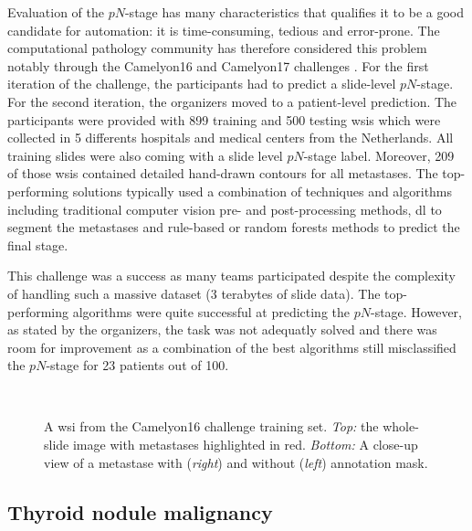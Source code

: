 Evaluation of the $pN$-stage has many characteristics that qualifies it to be a good candidate for automation: it is time-consuming, tedious and error-prone. The computational pathology community has therefore considered this problem notably through the Camelyon16 and Camelyon17 challenges \parencite{litjens2018camelyon}. For the first iteration of the challenge, the participants had to predict a slide-level $pN$-stage. For the second iteration, the organizers moved to a patient-level prediction. The participants were provided with 899 training and 500 testing \acrshort{wsi}s which were collected in 5 differents hospitals and medical centers from the Netherlands. All training slides were also coming with a slide level $pN$-stage label. Moreover, 209 of those \acrshort{wsi}s contained detailed hand-drawn contours for all metastases. The top-performing solutions typically used a combination of techniques and algorithms including traditional computer vision pre- and post-processing methods, \acrlong{dl} to segment the metastases and rule-based or random forests methods to predict the final stage. 

This challenge was a success as many teams participated despite the complexity of handling such a massive dataset (3 terabytes of slide data). The top-performing algorithms were quite successful at predicting the $pN$-stage. However, as stated by the organizers, the task was not adequatly solved and there was room for improvement \parencite{bandi2018detection} as a combination of the best algorithms still misclassified the $pN$-stage for 23 patients out of 100. 

\begin{figure}
  \centering
   \\
  \hspace{0.5cm}
  \caption{A \acrshort{wsi} from the Camelyon16 challenge training set. \textit{Top:} the whole-slide image with metastases highlighted in red. \textit{Bottom:} A close-up view of a metastase with (\textit{right}) and without (\textit{left}) annotation mask.}
  \label{fig:backdp:camelyon_sample}
\end{figure}

\subsection{Thyroid nodule malignancy}
\label{ssec:backdp:analysis_thyroid}

